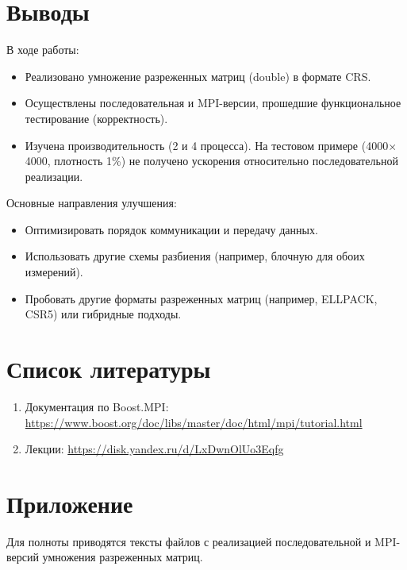 \documentclass[12pt]{article}
\begin{document}

\section{Выводы}
В ходе работы:
\begin{itemize}
    \item Реализовано умножение разреженных матриц (double) в формате CRS.
    \item Осуществлены последовательная и MPI-версии, прошедшие функциональное тестирование (корректность).
    \item Изучена производительность (2 и 4 процесса). На тестовом примере (4000$\times$4000, плотность 1\%) не получено ускорения относительно последовательной реализации.
\end{itemize}

Основные направления улучшения:
\begin{itemize}
    \item Оптимизировать порядок коммуникации и передачу данных.
    \item Использовать другие схемы разбиения (например, блочную для обоих измерений).
    \item Пробовать другие форматы разреженных матриц (например, ELLPACK, CSR5) или гибридные подходы.
\end{itemize}


\section{Список литературы}
\begin{enumerate}
    \item Документация по Boost.MPI: \url{https://www.boost.org/doc/libs/master/doc/html/mpi/tutorial.html}
    \item Лекции: \url{https://disk.yandex.ru/d/LxDwnOlUo3Eqfg}
\end{enumerate}

\appendix
\section*{Приложение}

Для полноты приводятся тексты файлов с реализацией последовательной и MPI-версий умножения разреженных матриц.
\end{document}
